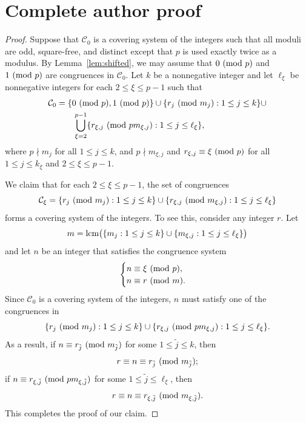 \documentclass[10pt,a4paper]{amsart}
\newcommand{\lcm}{\textup{lcm}}
\renewcommand{\mod}[2]{#1\textup{ (mod }#2\textup{)}}
\begin{document}
\section*{Complete author proof}
\begin{proof}
Suppose that $\mathcal{C}_0$ is a covering system of the integers such that all moduli are odd, square-free, and distinct except that $p$ is used exactly twice as a modulus. By Lemma~\ref{lem:shifted}, we may assume that $\mod{0}{p}$ and $\mod{1}{p}$ are congruences in $\mathcal{C}_0$. Let $k$ be a nonnegative integer and let $\ell_\xi$ be nonnegative integers for each $2\leq\xi\leq p-1$ such that
\begin{align*}
\mathcal{C}_0&=\{\mod{0}{p},\mod{1}{p}\}\cup\{\mod{r_j}{m_j}:1\leq j\leq k\}\cup\\
&\hspace{20pt}\bigcup_{\xi=2}^{p-1}\{\mod{r_{\xi,j}}{pm_{\xi,j}}:1\leq j\leq\ell_\xi\},
\end{align*}
where $p\nmid m_j$ for all $1\leq j\leq k$, and $p\nmid m_{\xi,j}$ and $r_{\xi,j}\equiv\mod{\xi}{p}$ for all $1\leq j\leq k_\xi$ and $2\leq\xi\leq p-1$.

We claim that for each $2\leq\xi\leq p-1$, the set of congruences 
$$\mathcal{C}_\xi=\{\mod{r_j}{m_j}:1\leq j\leq k\}\cup\{\mod{r_{\xi,j}}{m_{\xi,j}}:1\leq j\leq\ell_\xi\}$$
forms a covering system of the integers. To see this, consider any integer $r$. Let
$$m=\lcm\big(\{m_j:1\leq j\leq k\}\cup\{m_{\xi,j}:1\leq j\leq\ell_\xi\}\big)$$
and let $n$ be an integer that satisfies the congruence system
$$\begin{cases}
n\equiv\mod{\xi}{p},\\
n\equiv\mod{r}{m}.
\end{cases}$$
Since $\mathcal{C}_0$ is a covering system of the integers, $n$ must satisfy one of the congruences in
$$
\{\mod{r_j}{m_j}:1\leq j\leq k\}\cup\{\mod{r_{\xi,j}}{pm_{\xi,j}}:1\leq j\leq\ell_\xi\}.$$
As a result, if $n\equiv\mod{r_{\tilde{j}}}{m_{\tilde{j}}}$ for some $1\leq\tilde{j}\leq k$, then
$$r\equiv n\equiv\mod{r_{\tilde{j}}}{m_{\tilde{j}}};$$
if $n\equiv\mod{r_{\xi,\tilde{j}}}{pm_{\xi,\tilde{j}}}$ for some $1\leq\tilde{j}\leq\ell_\xi$, then
$$r\equiv n\equiv\mod{r_{\xi,\tilde{j}}}{m_{\xi,\tilde{j}}}.$$
This completes the proof of our claim.


\end{proof}
\end{document}
